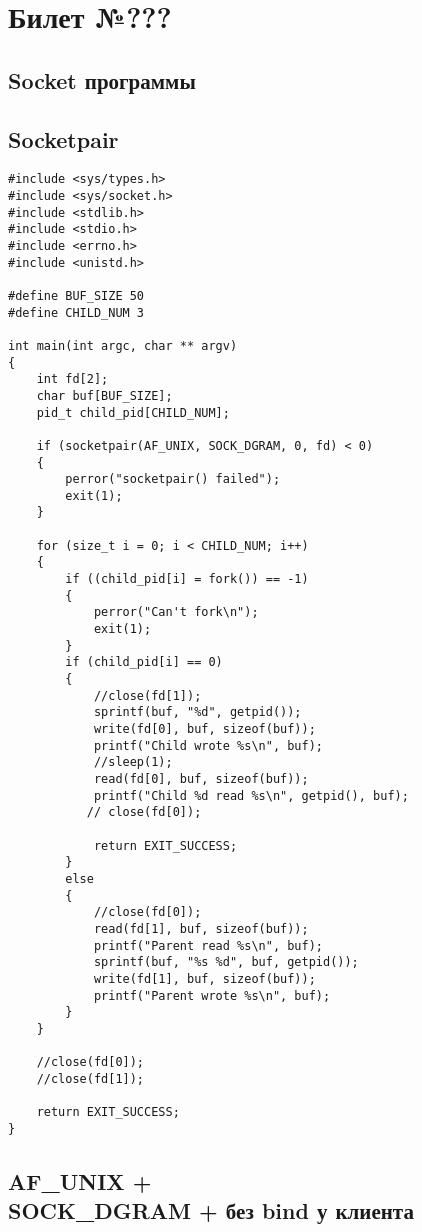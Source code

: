 \chapter{Билет №???}

\section*{Socket программы}

\section{Socketpair}

\begin{lstlisting}
#include <sys/types.h>
#include <sys/socket.h>
#include <stdlib.h>
#include <stdio.h>
#include <errno.h>
#include <unistd.h>

#define BUF_SIZE 50
#define CHILD_NUM 3

int main(int argc, char ** argv)
{
    int fd[2];
    char buf[BUF_SIZE];
    pid_t child_pid[CHILD_NUM];

    if (socketpair(AF_UNIX, SOCK_DGRAM, 0, fd) < 0) 
    {
        perror("socketpair() failed");
        exit(1);
    }

    for (size_t i = 0; i < CHILD_NUM; i++) 
    {
        if ((child_pid[i] = fork()) == -1)
        {
            perror("Can't fork\n");
            exit(1);
        }
        if (child_pid[i] == 0)
        {
            //close(fd[1]);
            sprintf(buf, "%d", getpid());
            write(fd[0], buf, sizeof(buf));
            printf("Child wrote %s\n", buf);
            //sleep(1);
            read(fd[0], buf, sizeof(buf));
            printf("Child %d read %s\n", getpid(), buf);
           // close(fd[0]);

            return EXIT_SUCCESS;
        }
        else 
        {
            //close(fd[0]);
            read(fd[1], buf, sizeof(buf));
            printf("Parent read %s\n", buf);
            sprintf(buf, "%s %d", buf, getpid());
            write(fd[1], buf, sizeof(buf));
            printf("Parent wrote %s\n", buf);
        }
    }

    //close(fd[0]);
    //close(fd[1]);

    return EXIT_SUCCESS;
}
\end{lstlisting}

\section{AF\_UNIX + \\ SOCK\_DGRAM + без bind у клиента}

